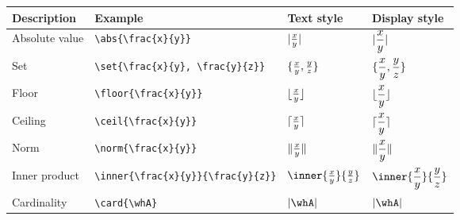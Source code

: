 \documentclass{article}
\begin{document}
\begin{center}
\begin{tabular}{@{}llll@{}}
\toprule
Description				& Example 					& Text style 				& Display style \\ \midrule
Absolute value 			& \verb!\abs{\frac{x}{y}}!        	& $\lvert\frac{x}{y}\rvert$ 		& $\displaystyle\lvert\frac{x}{y}\rvert$ \\[10pt]
Set 					& \verb!\set{\frac{x}{y}, \frac{y}{z}}!        & $\{\frac{x}{y}, \frac{y}{z}\}$ 	& $\displaystyle\{\frac{x}{y}, \frac{y}{z}\}$ \\[10pt]
Floor					& \verb!\floor{\frac{x}{y}}!        	& $\lfloor\frac{x}{y}\rfloor$ 		& $\displaystyle\lfloor\frac{x}{y}\rfloor$ \\[10pt]
Ceiling 				& \verb!\ceil{\frac{x}{y}}!        	& $\lceil\frac{x}{y}\rceil$ 		& $\displaystyle\lceil\frac{x}{y}\rceil$ \\[10pt]
Norm					& \verb!\norm{\frac{x}{y}}!       	& $\lVert\frac{x}{y}\rVert$ 	& $\displaystyle\lVert\frac{x}{y}\rVert$ \\[10pt]
Inner product			& \verb!\inner{\frac{x}{y}}{\frac{y}{z}}!       	& $\inner{\frac{x}{y}}{\frac{y}{z}}$ 	& $\displaystyle\inner{\frac{x}{y}}{\frac{y}{z}}$ \\[10pt]
Cardinality 				& \verb!\card{\whA}!       		& $\card{\whA}$ 			& $\displaystyle\card{\whA}$ \\[10pt]
\bottomrule
\end{tabular}
\end{center}

%
\end{document}
